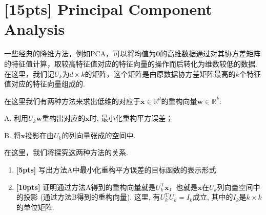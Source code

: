 \documentclass[a4paper,UTF8]{article}
\numberwithin{equation}{section}
\begin{document}
\section{[15pts] Principal Component Analysis}
一些经典的降维方法，例如PCA，可以将均值为$\mathbf{0}$的高维数据通过对其协方差矩阵的特征值计算，取较高特征值对应的特征向量的操作而后转化为维数较低的数据. 在这里，我们记$U_k$为$d\times k$的矩阵，这个矩阵是由原数据协方差矩阵最高的$k$个特征值对应的特征向量组成的. 

在这里我们有两种方法来求出低维的对应于$\mathbf{x}\in \mathbb{R}^d$的重构向量$\mathbf{w}\in \mathbb{R}^k$:

A. 利用$U_k\mathbf{w}$重构出对应的$\mathbf{x}$时, 最小化重构平方误差；

B. 将$\mathbf{x}$投影在由$U_k$的列向量张成的空间中.

在这里，我们将探究这两种方法的关系.
\begin{enumerate}[(1)]
	\item \textbf{[5pts]} 写出方法A中最小化重构平方误差的目标函数的表示形式.
	\item \textbf{[10pts]} 证明通过方法A得到的重构向量就是$U_k^\mathrm{T}\mathbf{x}$，也就是$\mathbf{x}$在$U_k$列向量空间中的投影 (通过方法B得到的重构向量). 这里, 有$U_k^\mathrm{T}U_k=I_k$成立, 其中的$I_k$是$k\times k$的单位矩阵.
\end{enumerate}
\end{document}
